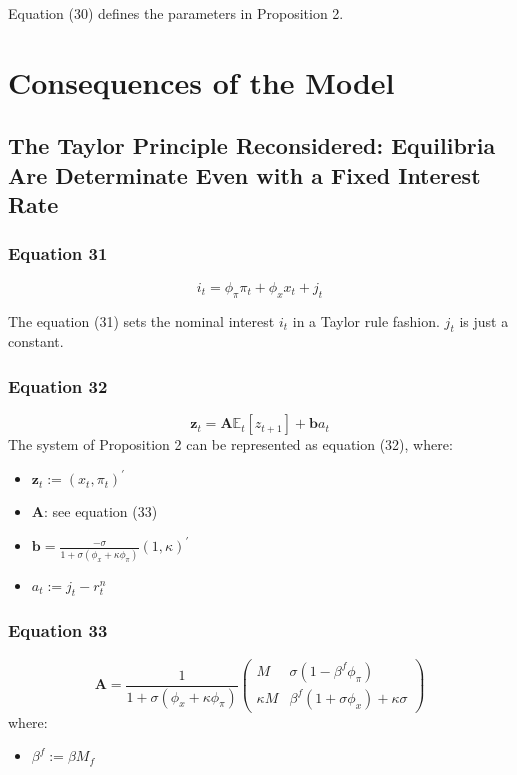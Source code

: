 \documentclass{article}
\begin{document}
Equation (30) defines the parameters in Proposition 2.

\section{Consequences of the Model}

\subsection{The Taylor Principle Reconsidered: Equilibria Are Determinate Even with a Fixed Interest Rate}

\subsubsection*{Equation 31}
\begin{equation}\tag{31}
    i_{t}=\phi_{\pi} \pi_{t}+\phi_{x}x_{t}+j_{t}
\end{equation}

The equation (31) sets the nominal interest $i_{t}$ in a Taylor rule fashion. $j_{t}$ is just a constant.

\subsubsection*{Equation 32}
\begin{equation}\tag{32}
\textbf{z}_{t}=\textbf{A}\mathbb{E}_{t}\left[z_{t+1}\right]+\textbf{b}a_{t}
\end{equation}
The system of Proposition 2 can be represented as equation (32), where:
\begin{itemize}
    \item $\textbf{z}_{t}:=(x_{t},\pi_{t})^{\prime}$
    \item $\textbf{A}$: see equation (33)
    \item $\textbf{b}=\frac{-\sigma}{1+\sigma(\phi_{x}+\kappa\phi_{\pi})}(1,\kappa)^{\prime}$
    \item $a_{t}:=j_{t}-r_{t}^{n}$
\end{itemize}

\subsubsection*{Equation 33}
\begin{equation}\tag{33}
    \textbf{A}=\frac{1}{1+\sigma(\phi_{x}+\kappa\phi_{\pi})}\begin{pmatrix} M & \sigma(1-\beta^{f}\phi_{\pi}) \\ \kappa M & \beta^{f}(1+\sigma\phi_{x})+\kappa\sigma \end{pmatrix}
\end{equation}
where:
\begin{itemize}
    \item $\beta^{f}:=\beta M_{f}$
\end{itemize}
\end{document}
